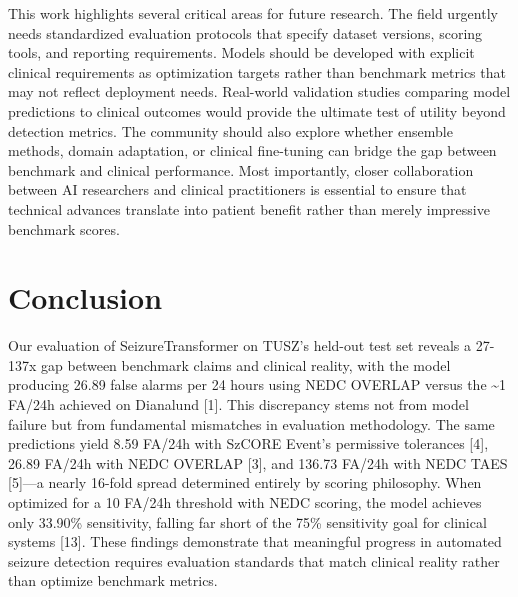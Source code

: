 \documentclass[
]{article}
\begin{document}
This work highlights several critical areas for future research. The
field urgently needs standardized evaluation protocols that specify
dataset versions, scoring tools, and reporting requirements. Models
should be developed with explicit clinical requirements as optimization
targets rather than benchmark metrics that may not reflect deployment
needs. Real-world validation studies comparing model predictions to
clinical outcomes would provide the ultimate test of utility beyond
detection metrics. The community should also explore whether ensemble
methods, domain adaptation, or clinical fine-tuning can bridge the gap
between benchmark and clinical performance. Most importantly, closer
collaboration between AI researchers and clinical practitioners is
essential to ensure that technical advances translate into patient
benefit rather than merely impressive benchmark scores.

\hypertarget{conclusion}{%
\section{Conclusion}\label{conclusion}}

Our evaluation of SeizureTransformer on TUSZ's held-out test set reveals
a 27-137x gap between benchmark claims and clinical reality, with the
model producing 26.89 false alarms per 24 hours using NEDC OVERLAP
versus the \textasciitilde1 FA/24h achieved on Dianalund {[}1{]}. This
discrepancy stems not from model failure but from fundamental mismatches
in evaluation methodology. The same predictions yield 8.59 FA/24h with
SzCORE Event's permissive tolerances {[}4{]}, 26.89 FA/24h with NEDC
OVERLAP {[}3{]}, and 136.73 FA/24h with NEDC TAES {[}5{]}---a nearly
16-fold spread determined entirely by scoring philosophy. When optimized
for a 10 FA/24h threshold with NEDC scoring, the model achieves only
33.90\% sensitivity, falling far short of the 75\% sensitivity goal for
clinical systems {[}13{]}. These findings demonstrate that meaningful
progress in automated seizure detection requires evaluation standards
that match clinical reality rather than optimize benchmark metrics.
\end{document}
